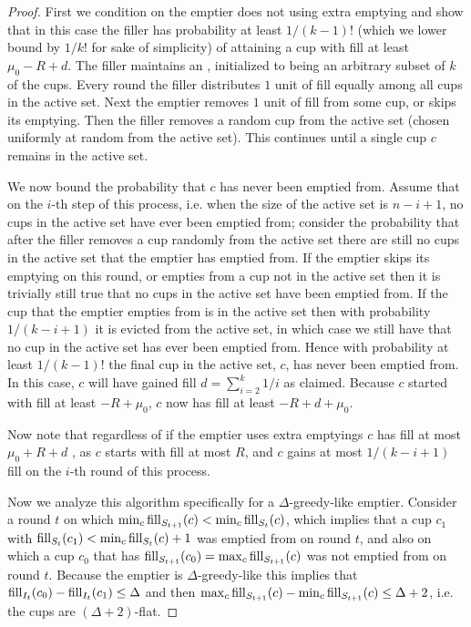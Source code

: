 \begin{proof}
  First we condition on the emptier does not using extra emptying
  and show that in this case the filler has probability at least
  $1/(k-1)!$ (which we lower bound by $1/k!$ for sake of
  simplicity) of attaining a cup with fill at least $\mu_0 -R +d$.
  The filler maintains an , initialized to being
  an arbitrary subset of $k$ of the cups. Every round the filler
  distributes $1$ unit of fill equally among all cups in the
  active set. Next the emptier removes $1$ unit of fill from some
  cup, or skips its emptying. Then the filler removes a random
  cup from the active set (chosen uniformly at random from the
  active set). This continues until a single cup $c$ remains in
  the active set. 

  We now bound the probability that $c$ has never been emptied
  from. Assume that on the $i$-th step of this process, i.e. when
  the size of the active set is $n-i+1$, no cups in the active
  set have ever been emptied from; consider the probability that
  after the filler removes a cup randomly from the active set
  there are still no cups in the active set that the emptier has
  emptied from. If the emptier skips its emptying on this round,
  or empties from a cup not in the active set then it is
  trivially still true that no cups in the active set have been
  emptied from. If the cup that the emptier empties from is in
  the active set then with probability $1/(k-i+1)$ it is evicted
  from the active set, in which case we still have that no
  cup in the active set has ever been emptied from. Hence with
  probability at least $1/(k-1)!$ the final cup in the
  active set, $c$, has never been emptied from. In this case, $c$
  will have gained fill $d=\sum_{i=2}^k 1/i$ as claimed. Because
  $c$ started with fill at least $-R+\mu_0$, $c$ now has fill at
  least $-R+ d+\mu_0$. 

  Now note that regardless of if the emptier uses extra emptyings
  $c$ has fill at most $\mu_0 + R + d$ , as $c$ starts with fill
  at most $R$, and $c$ gains at most $1/(k-i+1)$ fill on the
  $i$-th round of this process. 

  Now we analyze this algorithm specifically for a
  $\Delta$-greedy-like emptier. Consider a round $t$ on which
  $\min_c \operatorname{\text{\textup{fill}}}_{S_{t+1}}(c) < \min_c \operatorname{\text{\textup{fill}}}_{S_{t}}(c)$, which
  implies that a cup $c_1$ with $\operatorname{\text{\textup{fill}}}_{S_t}(c_1) < \min_c
  \operatorname{\text{\textup{fill}}}_{S_t}(c) +1$ was emptied from on round $t$, and also on
  which a cup $c_0$ that has $\operatorname{\text{\textup{fill}}}_{S_{t+1}}(c_0) = \max_{c}
  \operatorname{\text{\textup{fill}}}_{S_{t+1}}(c)$ was not emptied from on round $t$. Because
  the emptier is $\Delta$-greedy-like this
  implies that $\operatorname{\text{\textup{fill}}}_{I_t}(c_0) - \operatorname{\text{\textup{fill}}}_{I_t}(c_1) \le \Delta$
  and then $\max_c \operatorname{\text{\textup{fill}}}_{S_{t+1}}(c) - \min_c
  \operatorname{\text{\textup{fill}}}_{S_{t+1}}(c) \le \Delta + 2$, i.e. the cups are $(\Delta +
  2)$-flat. 


\end{proof}

